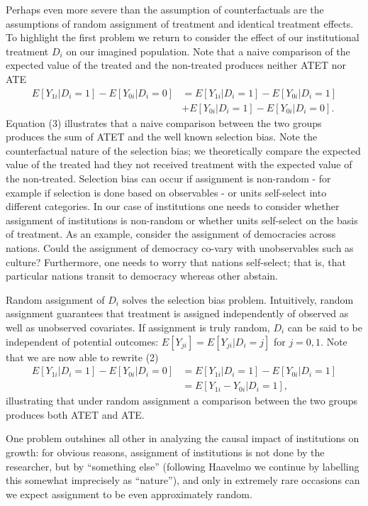\documentclass[12pt]{article}%
\begin{document}
Perhaps even more severe than the assumption of counterfactuals are the assumptions of random assignment of treatment and identical treatment effects. To highlight the first problem we return to consider the effect of our institutional treatment $D_i$ on our imagined population. Note that a naive comparison of the expected value of the treated and the non-treated produces neither ATET nor ATE
\begin{align}
E[Y_{1i}|D_i=1 ]-E[Y_{0i}|D_i=0 ]&=E[Y_{1i}|D_i=1 ]-E[Y_{0i}|D_i=1 ]\\\nonumber &+E[Y_{0i}|D_i=1 ]-E[Y_{0i}|D_i=0 ].
\end{align}
Equation (3) illustrates that a naive comparison between the two groups produces the sum of ATET and the well known selection bias. Note the counterfactual nature of the selection bias; we theoretically compare the expected value of the treated had they not received treatment with the expected value of the non-treated. Selection bias can occur if assignment is non-random - for example if selection is done based on observables - or units self-select into different categories. In our case of institutions one needs to consider whether assignment of institutions is non-random or whether units self-select on the basis of treatment. As an example, consider the assignment of democracies across nations. Could the assignment of democracy co-vary with unobservables such as culture? Furthermore, one needs to worry that nations self-select; that is, that particular nations transit to democracy whereas other abstain. 

Random assignment of $D_i$ solves the selection bias problem. Intuitively, random assignment guarantees that treatment is assigned independently  of observed as well as unobserved covariates. If assignment is truly random, $D_i$ can be said to be independent of potential outcomes: $E[Y_{ji}]=E[Y_{ji}|D_i=j]$ for $j=0,1$. Note that we are now able to rewrite (2) 
\begin{align}
E[Y_{1i}|D_i=1]-E[Y_{0i}|D_i=0 ]&=E[Y_{1i}|D_i=1 ]-E[Y_{0i}|D_i=1 ]\\\nonumber  &=E[Y_{1i}-Y_{0i}|D_i=1],
\end{align}
illustrating that under random assignment a comparison between the two groups produces both ATET and ATE. 

One problem outshines all other in analyzing the causal impact of institutions on growth: for obvious reasons, assignment of institutions is not done by the researcher, but by ``something else'' (following Haavelmo we continue by labelling this somewhat imprecisely as ``nature''), and only in extremely rare occasions can we expect assignment to be even approximately random. 
\end{document}
